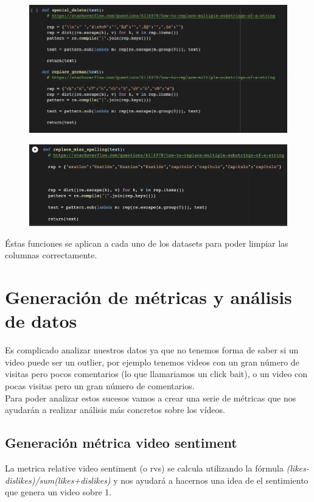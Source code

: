\documentclass[a4paper,12pt]{article}
\begin{document}
\begin{figure}[h!]
\centering
\includegraphics[width=13cm]{german_characters.png}
\end{figure}


\begin{figure}[h!]
\centering
\includegraphics[width=13cm]{misspellings.png}
\end{figure}

\'Estas funciones se aplican a cada uno de los datasets para poder limpiar las columnas correctamente.

\section[item_metricas]{Generaci\'on de m\'etricas y an\'alisis de datos}

Es complicado analizar nuestros datos ya que no tenemos forma de saber si un video puede ser un outlier, por ejemplo tenemos videos con un gran n\'umero de visitas pero pocos comentarios (lo que llamariamos un click bait), o un video con pocas visitas pero un gran n\'umero de comentarios.
\\
Para poder analizar estos sucesos vamos a crear una serie de m\'etricas que nos ayudar\'an a realizar an\'alisis m\'as concretos sobre los v\'ideos.

\subsection{Generaci\'on m\'etrica video sentiment}
La metrica relative video sentiment (o rvs) se calcula utilizando la f\'ormula {\itshape (likes-dislikes)/sum(likes+dislikes)} y nos ayudar\'a a hacernos una idea de el sentimiento que genera un video sobre 1.
\end{document}
